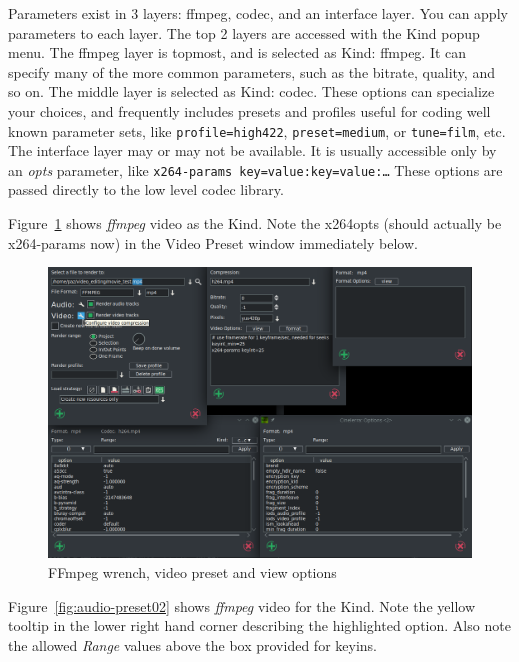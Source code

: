 Parameters exist in 3 layers: ffmpeg, codec, and an interface layer.  You can apply parameters to each layer.  The top 2 layers are accessed with the Kind popup menu. The ffmpeg layer is topmost, and is selected as Kind: ffmpeg.  It can specify many of the more common parameters, such as the bitrate, quality, and so on.  The middle layer is selected as Kind: codec.  These options can specialize your choices, and frequently includes presets and profiles useful for coding well known parameter sets, like \texttt{profile=high422}, \texttt{preset=medium}, or \texttt{tune=film}, etc.   The interface layer may or may not be available.  It is usually accessible only by an \textit{opts} parameter, like \texttt{x264-params key=value:key=value:\dots}  These options are passed directly to the low level codec library.

Figure~\ref{fig:video-preset} shows \textit{ffmpeg} video as the Kind. Note the x264opts (should actually be x264-params now) in the Video Preset window immediately below.

\begin{figure}[htpb]
    \centering
    \includegraphics[width=0.8\linewidth]{images/video-preset.png}
    \caption{FFmpeg wrench, video preset and view options}
    \label{fig:video-preset}
\end{figure}

Figure~\ref{fig:audio-preset02} shows \textit{ffmpeg} video for the Kind. Note the yellow tooltip in the lower right hand corner describing the highlighted option.  Also note the allowed \textit{Range} values above the box provided for keyins.

